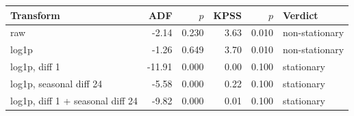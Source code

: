 \begin{tabular}{l rr rr l}
\toprule
Transform & ADF & $p$ & KPSS & $p$ & Verdict \\
\midrule
raw & -2.14 & 0.230 & 3.63 & 0.010 & non-stationary \\
log1p & -1.26 & 0.649 & 3.70 & 0.010 & non-stationary \\
log1p, diff 1 & -11.91 & 0.000 & 0.00 & 0.100 & stationary \\
log1p, seasonal diff 24 & -5.58 & 0.000 & 0.22 & 0.100 & stationary \\
log1p, diff 1 + seasonal diff 24 & -9.82 & 0.000 & 0.01 & 0.100 & stationary \\
\bottomrule
\end{tabular}
